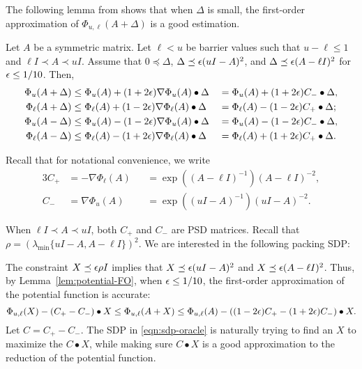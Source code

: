 The following lemma from \cite{LeeS17} shows that when $\Delta$ is small, the first-order approximation of $\Phi_{u,\ell}(A+\Delta)$ is a good estimation.

\begin{lemma}
\label{lem:potential-FO}
Let $A$ be a symmetric matrix.
Let $\ell < u$ be barrier values such that $u - \ell \le 1$ and $\ell I \prec A \prec u I$.
Assume that $0 \preceq \Delta$, $\Delta \preceq \epsilon (uI - A)^2$, and $\Delta \preceq \epsilon (A - \ell I)^2$ for $\epsilon \le 1/10$. Then,
\begin{alignat*}{3}
\Phi_{u}(A+\Delta) & \le \Phi_u(A) + (1+2\epsilon) \nabla \Phi_u(A) \bullet \Delta &&= \Phi_u(A) + (1+2\epsilon) C_- \bullet \Delta, \\
\Phi_{\ell}(A+\Delta) & \le \Phi_\ell(A) + (1-2\epsilon) \nabla \Phi_\ell(A) \bullet \Delta &&= \Phi_\ell(A) - (1-2\epsilon) C_+ \bullet \Delta; \\
\Phi_{u}(A-\Delta) & \le \Phi_u(A) - (1-2\epsilon) \nabla \Phi_u(A) \bullet \Delta &&= \Phi_u(A) - (1-2\epsilon) C_- \bullet \Delta, \\
\Phi_{\ell}(A-\Delta) & \le \Phi_\ell(A) - (1+2\epsilon) \nabla \Phi_\ell(A) \bullet \Delta &&= \Phi_\ell(A) + (1+2\epsilon) C_+ \bullet \Delta.
\end{alignat*}
\end{lemma}

Recall that for notational convenience, we write 
\begin{alignat*}{3}
C_+ & = -\nabla \Phi_\ell (A) &&= \exp \left((A - \ell I)^{-1}\right) (A - \ell I)^{-2}, \\
C_- & = \nabla \Phi_u (A) &&= \exp \left((u I - A)^{-1}\right) (u I - A)^{-2}.
\end{alignat*}

When $\ell I \prec A \prec u I$, both $C_+$ and $C_-$ are PSD matrices.
Recall that $\rho = (\lambda_{\min}\{uI-A, A-\ell I\} )^2$.
We are interested in the following packing SDP:
\begin{lp*}
 \tag{\ref{eqn:sdp-oracle}}
\st {}
\end{lp*}

The constraint $X \preceq \epsilon \rho I$ implies that $X \preceq \epsilon(uI-A)^2$ and $X \preceq \epsilon(A-\ell I)^2$.
Thus, by Lemma~\ref{lem:potential-FO}, when $\epsilon \le 1/10$, the first-order approximation of the potential function is accurate:
\[
\Phi_{u,\ell}(X) - (C_+ - C_-) \bullet X \le \Phi_{u,\ell}(A+X) \le \Phi_{u,\ell}(A) - ((1-2\epsilon) C_+ - (1+2\epsilon)C_- ) \bullet X.
\]
Let $C = C_+ - C_-$. The SDP in \eqref{eqn:sdp-oracle} is naturally trying to find an $X$ to maximize the $C \bullet X$, while making sure $C \bullet X$ is a good approximation to the reduction of the potential function.

